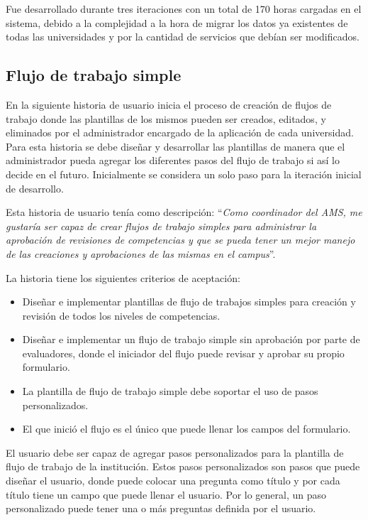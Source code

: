 Fue desarrollado durante tres iteraciones con un total de 170 horas cargadas en el sistema, debido a la complejidad a la hora de migrar los datos ya existentes de todas las universidades y por la cantidad de servicios que debían ser modificados.

\subsection{Flujo de trabajo simple}
En la siguiente historia de usuario inicia el proceso de creación de flujos de trabajo donde las plantillas de los mismos pueden ser creados, editados, y eliminados por el administrador encargado de la aplicación de cada universidad. Para esta historia se debe diseñar y desarrollar las plantillas de manera que el administrador pueda agregar los diferentes pasos del flujo de trabajo si así lo decide en el futuro. Inicialmente se considera un solo paso para la iteración inicial de desarrollo.

Esta historia de usuario tenía como descripción: \enquote{\textit{Como coordinador del AMS, me gustaría ser capaz de crear flujos de trabajo simples para administrar la aprobación de revisiones de competencias y que se pueda tener un mejor manejo de las creaciones y aprobaciones de las mismas en el campus}}.

La historia tiene los siguientes criterios de aceptación:
\begin{itemize}
	\item Diseñar e implementar plantillas de flujo de trabajos simples para creación y revisión de todos los niveles de competencias.
	\item Diseñar e implementar un flujo de trabajo simple sin aprobación por parte de evaluadores, donde el iniciador del flujo puede revisar y aprobar su propio formulario.
	\item La plantilla de flujo de trabajo simple debe soportar el uso de pasos personalizados.
	\item El que inició el flujo es el único que puede llenar los campos del formulario.
\end{itemize}

El usuario debe ser capaz de agregar pasos personalizados para la plantilla de flujo de trabajo de la institución. Estos pasos personalizados son pasos que puede diseñar el usuario, donde puede colocar una pregunta como título y por cada título tiene un campo que puede llenar el usuario. Por lo general, un paso personalizado puede tener una o más preguntas definida por el usuario.


